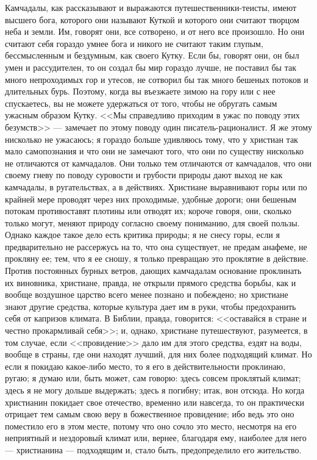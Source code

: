 \documentclass[12pt]{article}
\begin{document}
Камчадалы, как рассказывают и выражаются путешественники-теисты, имеют высшего бога, которого они называют Куткой и которого они считают творцом неба и земли. Им, говорят они, все сотворено, и от него все произошло. Но они считают себя гораздо умнее бога и никого не считают таким глупым, бессмысленным и бездумным, как своего Кутку. Если бы, говорят они, он был умен и рассудителен, то он создал бы мир гораздо лучше, не поставил бы так много непроходимых гор и утесов, не сотворил бы так много бешеных потоков и длительных бурь. Поэтому, когда вы въезжаете зимою на гору или с нее спускаетесь, вы не можете удержаться от того, чтобы не обругать самым ужасным образом Кутку. <<Мы справедливо приходим в ужас по поводу этих безумств>>  --- замечает по этому поводу один писатель-рационалист. Я же этому нисколько не ужасаюсь; я гораздо больше удивляюсь тому, что у христиан так мало самопознания и что они не замечают того, что они по существу нисколько не отличаются от камчадалов. Они только тем отличаются от камчадалов, что они своему гневу по поводу суровости и грубости природы дают выход не как камчадалы, в ругательствах, а в действиях. Христиане выравнивают горы или по крайней мере проводят через них проходимые, удобные дороги; они бешеным потокам противоставят плотины или отводят их; короче говоря, они, сколько только могут, меняют природу согласно своему пониманию, для своей пользы. Однако каждое такое дело есть критика природы; я не снесу горы, если я предварительно не рассержусь на то, что она существует, не предам анафеме, не прокляну ее; тем, что я ее сношу, я только превращаю это проклятие в действие. Против постоянных бурных ветров, дающих камчадалам основание проклинать их виновника, христиане, правда, не открыли прямого средства борьбы, как и вообще воздушное царство всего менее познано и побеждено; но христиане знают другие средства, которые культура дает им в руки, чтобы предохранить себя от капризов климата. В Библии, правда, говорится: <<оставайся в стране и честно прокармливай себя>>; и, однако, христиане путешествуют, разумеется, в том случае, если <<провидение>> дало им для этого средства, ездят на воды, вообще в страны, где они находят лучший, для них более подходящий климат. Но если я покидаю какое-либо место, то я его в действительности проклинаю, ругаю; я думаю или, быть может, сам говорю: здесь совсем проклятый климат; здесь я не могу дольше выдержать; здесь я погибну; итак, вон отсюда. Но когда христианин покидает свое отечество, временно или навсегда, то он практически отрицает тем самым свою веру в божественное провидение; ибо ведь это оно поместило его в этом месте, потому что оно сочло это место, несмотря на его неприятный и нездоровый климат или, вернее, благодаря ему, наиболее для него --- христианина --- подходящим и, стало быть, предопределило его жительство. 
\end{document}

